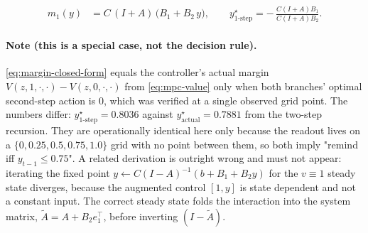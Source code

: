 \begin{align}
  m_1(y) &= C\,(I + A)\,\bigl(B_1 + B_2\,y\bigr),
  \qquad
  y^{\star}_{\text{1-step}} = -\,\frac{C(I+A)B_1}{C(I+A)B_2}.
  \label{eq:margin-closed-form}
\end{align}

\paragraph{Note (this is a special case, not the decision rule).}
\eqref{eq:margin-closed-form} equals the controller's actual margin
$V(z,1,\cdot,\cdot) - V(z,0,\cdot,\cdot)$ from \eqref{eq:mpc-value} only when both branches'
optimal second-step action is $0$, which was verified at a single observed grid point. The
numbers differ: $y^{\star}_{\text{1-step}} = 0.8036$ against $y^{\star}_{\text{actual}} =
0.7881$ from the two-step recursion. They are operationally identical here only because the
readout lives on a $\{0, 0.25, 0.5, 0.75, 1.0\}$ grid with no point between them, so both
imply "remind iff $y_{t-1} \le 0.75$". A related derivation is outright wrong and must not
appear: iterating the fixed point $y \leftarrow C(I-A)^{-1}(b + B_1 + B_2 y)$ for the
$v \equiv 1$ steady state diverges, because the augmented control $[1, y]$ is state dependent
and not a constant input. The correct steady state folds the interaction into the system
matrix, $\tilde A = A + B_2 e_1^\top$, before inverting $(I - \tilde A)$.

